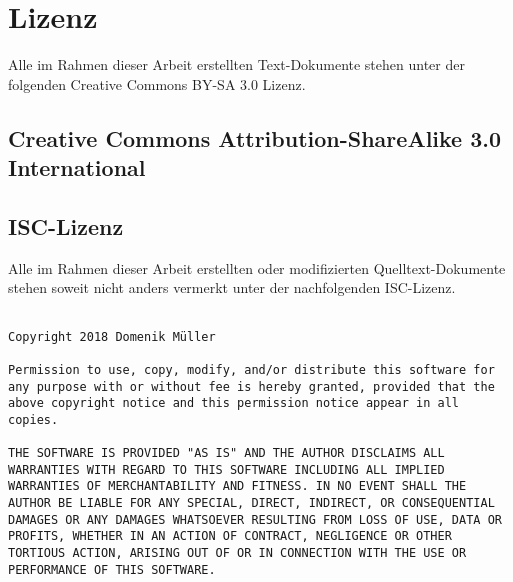 \chapter{Lizenz}

Alle im Rahmen dieser Arbeit erstellten Text-Dokumente stehen unter der folgenden Creative Commons BY-SA 3.0 Lizenz.




\section{Creative Commons Attribution-ShareAlike 3.0 International}
\label{Lizenz:CC}

\doclicenseThis

\doclicenseFullText


\clearpage

\section{ISC-Lizenz}
\label{Lizenz:ISC}

Alle im Rahmen dieser Arbeit erstellten oder modifizierten Quelltext-Dokumente stehen soweit nicht anders vermerkt unter der nachfolgenden ISC-Lizenz. 

\begin{verbatim}

Copyright 2018 Domenik Müller

Permission to use, copy, modify, and/or distribute this software for any purpose with or without fee is hereby granted, provided that the above copyright notice and this permission notice appear in all copies.

THE SOFTWARE IS PROVIDED "AS IS" AND THE AUTHOR DISCLAIMS ALL WARRANTIES WITH REGARD TO THIS SOFTWARE INCLUDING ALL IMPLIED WARRANTIES OF MERCHANTABILITY AND FITNESS. IN NO EVENT SHALL THE AUTHOR BE LIABLE FOR ANY SPECIAL, DIRECT, INDIRECT, OR CONSEQUENTIAL DAMAGES OR ANY DAMAGES WHATSOEVER RESULTING FROM LOSS OF USE, DATA OR PROFITS, WHETHER IN AN ACTION OF CONTRACT, NEGLIGENCE OR OTHER TORTIOUS ACTION, ARISING OUT OF OR IN CONNECTION WITH THE USE OR PERFORMANCE OF THIS SOFTWARE.
\end{verbatim}

